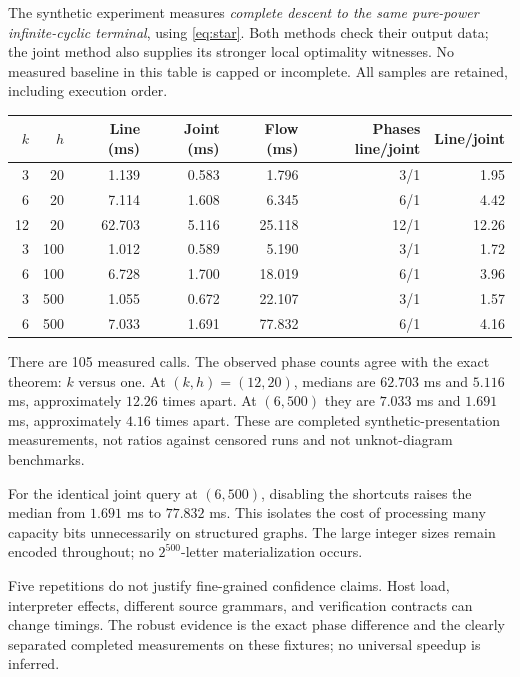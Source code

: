 \documentclass[11pt,letterpaper]{article}
\theoremstyle{definition}
\theoremstyle{remark}\newtheorem{remark}[theorem]{Remark}
\begin{document}
The synthetic experiment measures \emph{complete descent to the same
pure-power infinite-cyclic terminal}, using \eqref{eq:star}. Both methods
check their output data; the joint method also supplies its stronger local
optimality witnesses. No measured baseline in this table is capped or
incomplete. All samples are retained, including execution order.
\begin{center}
\small
\begin{tabular}{@{}rrrrrrr@{}}
\toprule
$k$ & $h$ & Line (ms) & Joint (ms) & Flow (ms) & Phases line/joint & Line/joint\\
\midrule
3 & 20 & 1.139 & 0.583 & 1.796 & 3/1 & 1.95\\
6 & 20 & 7.114 & 1.608 & 6.345 & 6/1 & 4.42\\
12 & 20 & 62.703 & 5.116 & 25.118 & 12/1 & 12.26\\
3 & 100 & 1.012 & 0.589 & 5.190 & 3/1 & 1.72\\
6 & 100 & 6.728 & 1.700 & 18.019 & 6/1 & 3.96\\
3 & 500 & 1.055 & 0.672 & 22.107 & 3/1 & 1.57\\
6 & 500 & 7.033 & 1.691 & 77.832 & 6/1 & 4.16\\
\bottomrule
\end{tabular}
\end{center}
There are 105 measured calls. The observed phase counts agree with the
exact theorem: $k$ versus one. At $(k,h)=(12,20)$, medians are $62.703$ ms
and $5.116$ ms, approximately $12.26$ times apart. At $(6,500)$ they are
$7.033$ ms and $1.691$ ms, approximately $4.16$ times apart. These are
completed synthetic-presentation measurements, not ratios against censored
runs and not unknot-diagram benchmarks.

For the identical joint query at $(6,500)$, disabling the shortcuts raises
the median from $1.691$ ms to $77.832$ ms. This isolates the cost of processing
many capacity bits unnecessarily on structured graphs. The large integer
sizes remain encoded throughout; no $2^{500}$-letter materialization occurs.

Five repetitions do not justify fine-grained confidence claims. Host load,
interpreter effects, different source grammars, and verification contracts
can change timings. The robust evidence is the exact phase difference and
the clearly separated completed measurements on these fixtures; no universal
speedup is inferred.
\end{document}
